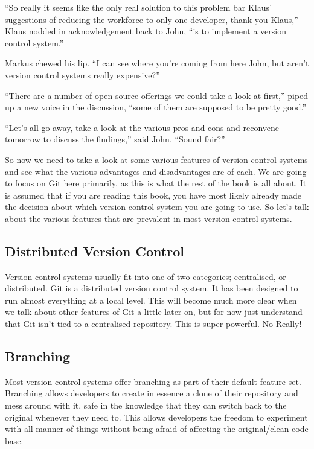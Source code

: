 \begin{trenches}
``So really it seems like the only real solution to this problem bar Klaus' suggestions of reducing the workforce to only one developer, thank you Klaus,'' Klaus nodded in acknowledgement back to John, ``is to implement a version control system.''

Markus chewed his lip.  ``I can see where you're coming from here John, but aren't version control systems really expensive?''

``There are a number of open source offerings we could take a look at first,'' piped up a new voice in the discussion, ``some of them are supposed to be pretty good.''

``Let's all go away, take a look at the various pros and cons and reconvene tomorrow to discuss the findings,'' said John.  ``Sound fair?''
\end{trenches}

So now we need to take a look at some various features of version control systems and see what the various advantages and disadvantages are of each.  We are going to focus on Git here primarily, as this is what the rest of the book is all about.  It is assumed that if you are reading this book, you have most likely already made the decision about which version control system you are going to use.  So let's talk about the various features that are prevalent in most version control systems.

\subsection{Distributed Version Control}

Version control systems usually fit into one of two categories; centralised, or distributed.  Git is a distributed version control system.  It has been designed to run almost everything at a local level.  This will become much more clear when we talk about other features of Git a little later on, but for now just understand that Git isn't tied to a centralised repository.  This is super powerful.  No Really!

\subsection{Branching}

Most version control systems offer branching as part of their default feature set.  Branching allows developers to create in essence a clone of their repository and mess around with it, safe in the knowledge that they can switch back to the original whenever they need to.  This allows developers the freedom to experiment with all manner of things without being afraid of affecting the original/clean code base.

